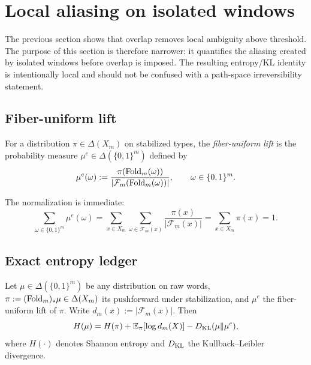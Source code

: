 \section{Local aliasing on isolated windows}\label{sec:entropy-ledger}

The previous section shows that overlap removes local ambiguity above threshold. The purpose of this section is therefore narrower: it quantifies the aliasing created by isolated windows before overlap is imposed. The resulting entropy/KL identity is intentionally local and should not be confused with a path-space irreversibility statement.

\subsection{Fiber-uniform lift}\label{sec:entropy-ledger:lifts}

\begin{definition}\label{def:fiber-lift}
For a distribution $\pi\in\Delta(X_m)$ on stabilized types, the \emph{fiber-uniform lift} is the probability measure $\mu^e\in\Delta(\{0,1\}^m)$ defined by
\[
\mu^e(\omega):=\frac{\pi(\mathrm{Fold}_m(\omega))}{|\mathcal{F}_m(\mathrm{Fold}_m(\omega))|},
\qquad \omega\in\{0,1\}^m.
\]
\end{definition}

\begin{remark}
The normalization is immediate:
\[
\sum_{\omega\in\{0,1\}^m}\mu^e(\omega)
=
\sum_{x\in X_m}\sum_{\omega\in\mathcal{F}_m(x)}\frac{\pi(x)}{|\mathcal{F}_m(x)|}
=
\sum_{x\in X_m}\pi(x)=1.
\]
\end{remark}

\subsection{Exact entropy ledger}\label{sec:entropy-ledger:identity}

\begin{theorem}\label{thm:kl-ledger}
Let $\mu\in\Delta(\{0,1\}^m)$ be any distribution on raw words, $\pi:=(\mathrm{Fold}_m)_*\mu\in\Delta(X_m)$ its pushforward under stabilization, and $\mu^e$ the fiber-uniform lift of $\pi$. Write $d_m(x):=|\mathcal{F}_m(x)|$. Then
\begin{equation}\label{eq:kl-ledger}
H(\mu)=H(\pi)+\mathbb{E}_\pi[\log d_m(X)]-D_{\mathrm{KL}}(\mu\|\mu^e),
\end{equation}
where $H(\cdot)$ denotes Shannon entropy and $D_{\mathrm{KL}}$ the Kullback--Leibler divergence.
\end{theorem}

